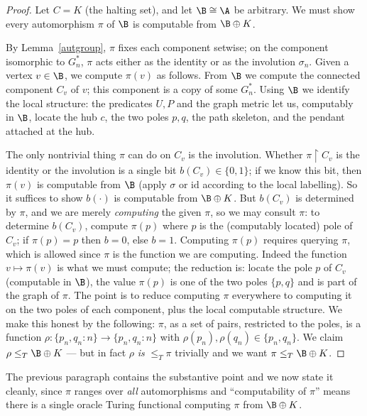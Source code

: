 \begin{proof}
Let $C=K$ (the halting set), and let $\B\cong\A$ be arbitrary. We must show every
automorphism $\pi$ of $\B$ is computable from $\B\oplus K$.

By Lemma~\ref{autgroup}, $\pi$ fixes each component setwise; on the component
isomorphic to $G_n^\ast$, $\pi$ acts either as the identity or as the involution
$\sigma_n$. Given a vertex $v\in\B$, we compute $\pi(v)$ as follows. From $\B$ we
compute the connected component $C_v$ of $v$; this component is a copy of some
$G_n^\ast$. Using $\B$ we identify the local structure: the predicates $U,P$ and the
graph metric let us, computably in $\B$, locate the hub $c$, the two poles
$p,q$, the path skeleton, and the pendant attached at the hub.

The only nontrivial thing $\pi$ can do on $C_v$ is the involution. Whether
$\pi\restriction C_v$ is the identity or the involution is a single bit
$b(C_v)\in\{0,1\}$; if we know this bit, then $\pi(v)$ is computable from $\B$
(apply $\sigma$ or $\mathrm{id}$ according to the local labelling). So it suffices to
show $b(\cdot)$ is computable from $\B\oplus K$. But $b(C_v)$ is determined by
$\pi$, and we are merely \emph{computing} the given $\pi$, so we may consult $\pi$:
to determine $b(C_v)$, compute $\pi(p)$ where $p$ is the (computably located) pole
of $C_v$; if $\pi(p)=p$ then $b=0$, else $b=1$. Computing $\pi(p)$ requires querying
$\pi$, which is allowed since $\pi$ is the function we are computing. Indeed the
function $v\mapsto\pi(v)$ is what we must compute; the reduction is: locate the pole
$p$ of $C_v$ (computable in $\B$), the value $\pi(p)$ is one of the two poles
$\{p,q\}$ and is part of the graph of $\pi$. The point is to reduce computing
$\pi$ everywhere to computing it on the two poles of each component, plus the
local computable structure. We make this honest by the following: $\pi$, as a set
of pairs, restricted to the poles, is a function
$\rho:\{p_n,q_n:n\}\to\{p_n,q_n:n\}$ with $\rho(p_n),\rho(q_n)\in\{p_n,q_n\}$. We
claim $\rho\le_T\B\oplus K$ — but in fact $\rho$ \emph{is} $\le_T \pi$ trivially and
we want $\pi\le_T\B\oplus K$.
\end{proof}

The previous paragraph contains the substantive point and we now state it cleanly,
since $\pi$ ranges over \emph{all} automorphisms and ``computability of $\pi$''
means there is a single oracle Turing functional computing $\pi$ from $\B\oplus K$.

